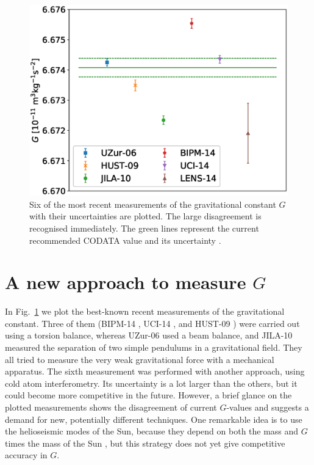 \documentclass[onecolumn]{aa} %
\begin{document}
\begin{figure}
	\centering
	\includegraphics[width=\textwidth]{img/plotGmeas}
	\caption{Six of the most recent measurements of the gravitational constant $G$ with their uncertainties are plotted. The large disagreement is recognised immediately. The green lines represent the current recommended CODATA value and its uncertainty \citep{CODATA17}.}
	\label{fig:Gmeasurements}
\end{figure}

\section{A new approach to measure $G$}
In Fig.~\ref{fig:Gmeasurements} we plot the best-known recent
measurements of the gravitational constant. Three of them
(BIPM-14 \citep{Quinn14}, UCI-14 \citep{Newman14}, and
HUST-09 \citep{Luo09}) were carried out using a torsion balance, whereas
UZur-06 \citep{Schlamminger06} used a beam balance, and
JILA-10 \citep{Parks10} measured the separation of two simple pendulums
in a gravitational field. They all tried to measure the very weak
gravitational force with a mechanical apparatus. The sixth measurement
\citep[LENS-14][]{Rosi14} was performed with another approach, using cold
atom interferometry. Its uncertainty is a lot larger than the others,
but it could become more competitive in the future. However, a brief
glance on the plotted measurements shows the disagreement of current
$G$-values and suggests a demand for new, potentially different
techniques.  One remarkable idea is to use the helioseismic modes of
the Sun, because they depend on both the mass and $G$ times the mass
of the Sun \citep{Ch-Dalsgaard05}, but this strategy does not yet give
competitive accuracy in $G$.
\end{document}
